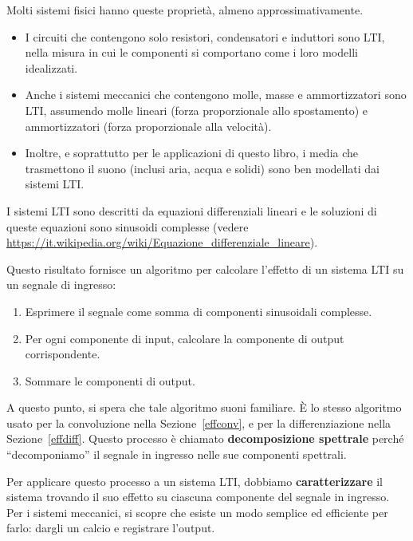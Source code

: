 \documentclass[12pt,a4paper]{book}
\begin{document}
Molti sistemi fisici hanno queste proprietà, almeno approssimativamente.

\begin{itemize} 

\item I circuiti che contengono solo resistori, condensatori e induttori sono LTI, nella misura in cui le componenti si comportano come i loro modelli idealizzati.

\item Anche i sistemi meccanici che contengono molle, masse e ammortizzatori sono LTI, assumendo molle lineari (forza proporzionale allo spostamento) e ammortizzatori (forza proporzionale alla velocità).

\item Inoltre, e soprattutto per le applicazioni di questo libro, i media che trasmettono il suono (inclusi aria, acqua e solidi) sono ben modellati dai sistemi LTI.

\end{itemize} 

I sistemi LTI sono descritti da equazioni differenziali lineari e le soluzioni di queste equazioni sono sinusoidi complesse (vedere \url{https://it.wikipedia.org/wiki/Equazione_differenziale_lineare}).

Questo risultato fornisce un algoritmo per calcolare l'effetto di un sistema LTI su un segnale di ingresso:

\begin{enumerate} 

\item Esprimere il segnale come somma di componenti sinusoidali complesse.

\item Per ogni componente di input, calcolare la componente di output corrispondente.

\item Sommare le componenti di output.

\end{enumerate} 

A questo punto, si spera che tale algoritmo suoni familiare. È lo stesso algoritmo usato per la convoluzione nella Sezione~\ref{effconv}, e per la differenziazione nella Sezione~\ref{effdiff}. Questo processo è chiamato {\bf decomposizione spettrale} perché ``decomponiamo'' il segnale in ingresso nelle sue componenti spettrali.

Per applicare questo processo a un sistema LTI, dobbiamo {\bf caratterizzare} il sistema trovando il suo effetto su ciascuna componente del segnale in ingresso. Per i sistemi meccanici, si scopre che esiste un modo semplice ed efficiente per farlo: dargli un calcio e registrare l'output.
\end{document}
